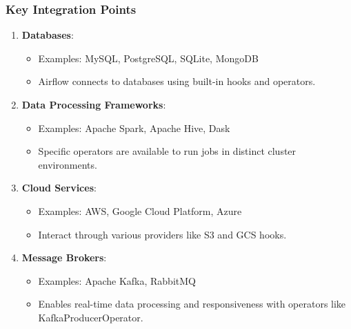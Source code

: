 \documentclass[aspectratio=169]{beamer}
\begin{document}
\begin{frame}
    \frametitle{Key Integration Points}
    \begin{enumerate}
        \item \textbf{Databases}:
            \begin{itemize}
                \item Examples: MySQL, PostgreSQL, SQLite, MongoDB
                \item Airflow connects to databases using built-in hooks and operators.
            \end{itemize}
        
        \item \textbf{Data Processing Frameworks}:
            \begin{itemize}
                \item Examples: Apache Spark, Apache Hive, Dask
                \item Specific operators are available to run jobs in distinct cluster environments.
            \end{itemize}
        
        \item \textbf{Cloud Services}:
            \begin{itemize}
                \item Examples: AWS, Google Cloud Platform, Azure
                \item Interact through various providers like S3 and GCS hooks.
            \end{itemize}
        
        \item \textbf{Message Brokers}:
            \begin{itemize}
                \item Examples: Apache Kafka, RabbitMQ
                \item Enables real-time data processing and responsiveness with operators like KafkaProducerOperator.
            \end{itemize}
    \end{enumerate}
\end{frame}
\end{document}
